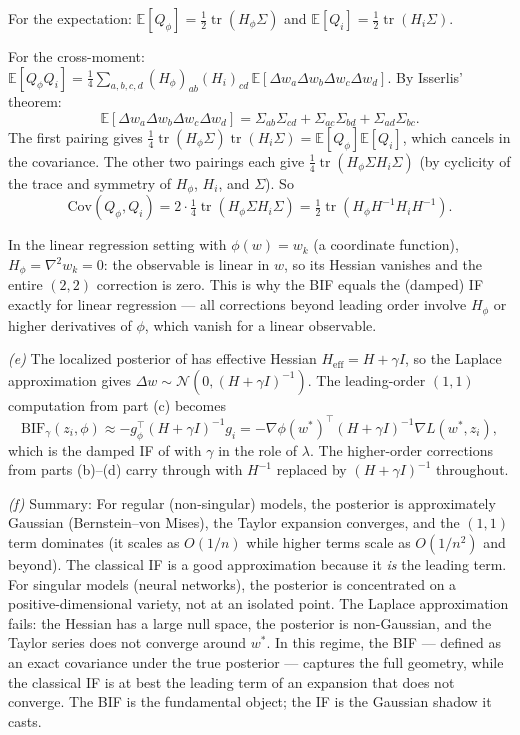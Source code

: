 \documentclass[11pt]{article}
\newcommand{\E}{\mathbb{E}}
\DeclareMathOperator{\tr}{tr}
\begin{document}
\begin{solution}
For the expectation: $\E[Q_\phi] = \tfrac12\tr(H_\phi\Sigma)$ and $\E[Q_i] = \tfrac12\tr(H_i\Sigma)$.

For the cross-moment: $\E[Q_\phi Q_i] = \tfrac14\sum_{a,b,c,d}(H_\phi)_{ab}(H_i)_{cd}\,\E[\Delta w_a\Delta w_b\Delta w_c\Delta w_d]$. By Isserlis' theorem:
\[
  \E[\Delta w_a\Delta w_b\Delta w_c\Delta w_d] = \Sigma_{ab}\Sigma_{cd} + \Sigma_{ac}\Sigma_{bd} + \Sigma_{ad}\Sigma_{bc}.
\]
The first pairing gives $\tfrac14\tr(H_\phi\Sigma)\tr(H_i\Sigma) = \E[Q_\phi]\E[Q_i]$, which cancels in the covariance. The other two pairings each give $\tfrac14\tr(H_\phi\Sigma H_i\Sigma)$ (by cyclicity of the trace and symmetry of $H_\phi$, $H_i$, and $\Sigma$). So
\[
  \mathrm{Cov}(Q_\phi,Q_i) = 2\cdot\tfrac14\tr(H_\phi\Sigma H_i\Sigma) = \tfrac12\tr(H_\phi H^{-1}H_i H^{-1}).
\]

In the linear regression setting with $\phi(w) = w_k$ (a coordinate function), $H_\phi = \nabla^2 w_k = 0$: the observable is linear in $w$, so its Hessian vanishes and the entire $(2,2)$ correction is zero. This is why the BIF equals the (damped) IF exactly for linear regression --- all corrections beyond leading order involve $H_\phi$ or higher derivatives of $\phi$, which vanish for a linear observable.

\textit{(e)} The localized posterior of  has effective Hessian $H_{\mathrm{eff}} = H + \gamma I$, so the Laplace approximation gives $\Delta w\sim\mathcal{N}(0,(H+\gamma I)^{-1})$. The leading-order $(1,1)$ computation from part (c) becomes
\[
  \mathrm{BIF}_\gamma(z_i,\phi) \approx -g_\phi^\top(H+\gamma I)^{-1}g_i = -\nabla\phi(w^*)^\top(H+\gamma I)^{-1}\nabla L(w^*,z_i),
\]
which is the damped IF of  with $\gamma$ in the role of $\lambda$. The higher-order corrections from parts (b)--(d) carry through with $H^{-1}$ replaced by $(H+\gamma I)^{-1}$ throughout.

\textit{(f)} Summary: For regular (non-singular) models, the posterior is approximately Gaussian (Bernstein--von Mises), the Taylor expansion converges, and the $(1,1)$ term dominates (it scales as $O(1/n)$ while higher terms scale as $O(1/n^2)$ and beyond). The classical IF is a good approximation because it \emph{is} the leading term. For singular models (neural networks), the posterior is concentrated on a positive-dimensional variety, not at an isolated point. The Laplace approximation fails: the Hessian has a large null space, the posterior is non-Gaussian, and the Taylor series does not converge around $w^*$. In this regime, the BIF --- defined as an exact covariance under the true posterior --- captures the full geometry, while the classical IF is at best the leading term of an expansion that does not converge. The BIF is the fundamental object; the IF is the Gaussian shadow it casts.

\end{solution}
\end{document}
